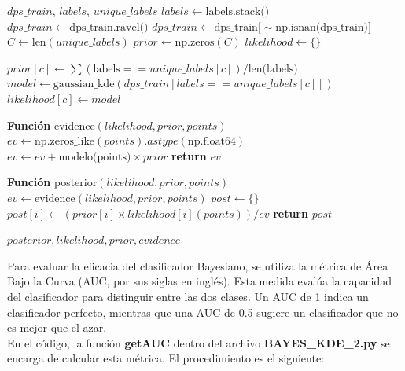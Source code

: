 \begin{algorithm}
	\caption{Entrenamiento Bayesiano con KDE}
	\begin{algorithmic}[1]
		\REQUIRE $dps\_train$, $labels$, $unique\_labels$
		\STATE $labels \gets \text{labels.stack()}$
		\STATE $dps\_train \gets \text{dps\_train.ravel()}$
		\STATE $dps\_train \gets \text{dps\_train[}\sim\text{np.isnan(dps\_train)]}$
		\STATE $C \gets \text{len}(unique\_labels)$
		\STATE $prior \gets \text{np.zeros}(C)$
		\STATE $likelihood \gets \{\}$
		
		\STATE $prior[c] \gets \sum(\text{labels} == unique\_labels[c]) / \text{len(labels)}$
		\STATE $model \gets \text{gaussian\_kde}(dps\_train[labels == unique\_labels[c]])$
		\STATE $likelihood[c] \gets model$
		\ENDFOR
	
		\STATE \textbf{Función} evidence$(likelihood, prior, points)$
		\STATE \quad $ev \gets \text{np.zeros\_like}(points).astype(\text{np.float64})$
		\STATE \quad $ev \gets ev + \text{modelo(points)} \times prior$
		\ENDFOR
		\STATE \quad \textbf{return} $ev$
		
		\STATE \textbf{Función} posterior$(likelihood, prior, points)$
		\STATE \quad $ev \gets \text{evidence}(likelihood, prior, points)$
		\STATE \quad $post \gets \{\}$
		\STATE \quad $post[i] \gets (prior[i] \times likelihood[i](points)) / ev$
		\ENDFOR
		\STATE \quad \textbf{return} $post$
	
		\RETURN $posterior, likelihood, prior, evidence$
	\end{algorithmic}
\end{algorithm}



Para evaluar la eficacia del clasificador Bayesiano, se utiliza la métrica de Área Bajo la Curva (AUC, por sus siglas en inglés). Esta medida evalúa la capacidad del clasificador para distinguir entre las dos clases. Un AUC de 1 indica un clasificador perfecto, mientras que una AUC de 0.5 sugiere un clasificador que no es mejor que el azar.\\

En el código, la función \textbf{getAUC} dentro del archivo \textbf{BAYES\_KDE\_2.py} se encarga de calcular esta métrica. El procedimiento es el siguiente:


